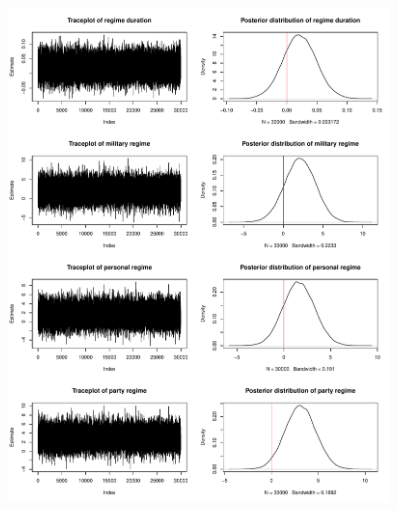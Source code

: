\begin{figure}[H]
    \centering
    \includegraphics[width=0.9\textwidth]{../fig/mcmc_diagnostic2}
    \label{fig:mcmc_diagnostic2}
\end{figure}

